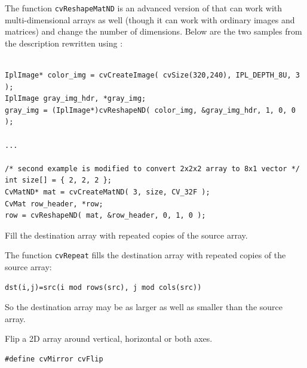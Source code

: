 The function \texttt{cvReshapeMatND} is an advanced version of  that can work with multi-dimensional arrays as well (though it can work with ordinary images and matrices) and change the number of dimensions. Below are the two samples from the  description rewritten using :

\begin{lstlisting}

IplImage* color_img = cvCreateImage( cvSize(320,240), IPL_DEPTH_8U, 3 );
IplImage gray_img_hdr, *gray_img;
gray_img = (IplImage*)cvReshapeND( color_img, &gray_img_hdr, 1, 0, 0 );

...

/* second example is modified to convert 2x2x2 array to 8x1 vector */
int size[] = { 2, 2, 2 };
CvMatND* mat = cvCreateMatND( 3, size, CV_32F );
CvMat row_header, *row;
row = cvReshapeND( mat, &row_header, 0, 1, 0 );

\end{lstlisting}

\label{Repeat}

Fill the destination array with repeated copies of the source array.


\begin{description}
\end{description}


The function \texttt{cvRepeat} fills the destination array with repeated copies of the source array:

\begin{lstlisting}
dst(i,j)=src(i mod rows(src), j mod cols(src))
\end{lstlisting}

So the destination array may be as larger as well as smaller than the source array.


\label{Flip}

Flip a 2D array around vertical, horizontal or both axes.


\begin{lstlisting}
#define cvMirror cvFlip
\end{lstlisting}


